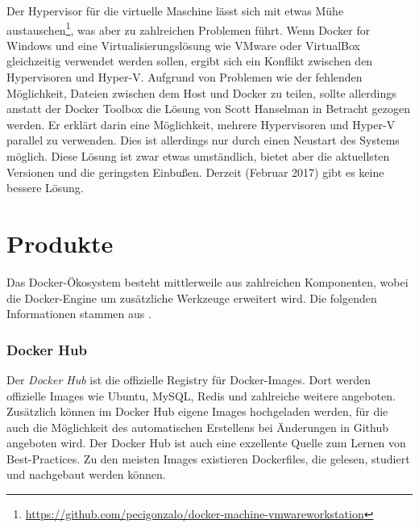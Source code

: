 Der Hypervisor für die virtuelle Maschine lässt sich mit etwas Mühe austauschen\footnote{\url{https://github.com/pecigonzalo/docker-machine-vmwareworkstation}}, was aber zu zahlreichen Problemen führt.
Wenn Docker for Windows und eine Virtualisierungslösung wie VMware oder VirtualBox gleichzeitig verwendet werden sollen, ergibt sich ein Konflikt zwischen den Hypervisoren und Hyper-V.
Aufgrund von Problemen wie der fehlenden Möglichkeit, Dateien zwischen dem Host und Docker zu teilen, sollte allerdings anstatt der Docker Toolbox die Lösung von Scott Hanselman \autocite{hanselman-vms:online} in Betracht gezogen werden.
Er erklärt darin eine Möglichkeit, mehrere Hypervisoren und Hyper-V parallel zu verwenden.
Dies ist allerdings nur durch einen Neustart des Systems möglich.
Diese Lösung ist zwar etwas umständlich, bietet aber die aktuellsten Versionen und die geringsten Einbußen.
Derzeit (Februar 2017) gibt es keine bessere Lösung.


\section{Produkte}
\label{sec:docker-products}
Das Docker-Ökosystem besteht mittlerweile aus zahlreichen Komponenten, wobei die Docker-Engine um zusätzliche Werkzeuge erweitert wird.
Die folgenden Informationen stammen aus \autocite{docker-engine:online}.
\subsubsection{Docker Hub}
\label{sec:docker-hub}
Der \emph{Docker Hub} ist die offizielle Registry für Docker-Images. Dort werden offizielle Images wie Ubuntu, MySQL, Redis und zahlreiche weitere angeboten.
Zusätzlich können im Docker Hub eigene Images hochgeladen werden, für die auch die Möglichkeit des automatischen Erstellens bei Änderungen in Github angeboten wird.
Der Docker Hub ist auch eine exzellente Quelle zum Lernen von Best-Practices.
Zu den meisten Images existieren Dockerfiles, die gelesen, studiert und nachgebaut werden können.
